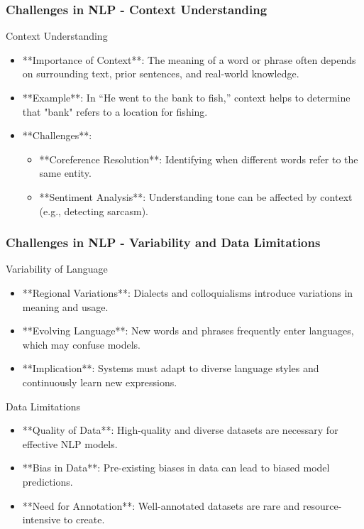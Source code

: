 \documentclass{beamer}
\begin{document}
\begin{frame}[fragile]
    \frametitle{Challenges in NLP - Context Understanding}
    \begin{block}{Context Understanding}
        \begin{itemize}
            \item **Importance of Context**: The meaning of a word or phrase often depends on surrounding text, prior sentences, and real-world knowledge.
            \item **Example**: In “He went to the bank to fish,” context helps to determine that "bank" refers to a location for fishing.
            \item **Challenges**:
            \begin{itemize}
                \item **Coreference Resolution**: Identifying when different words refer to the same entity.
                \item **Sentiment Analysis**: Understanding tone can be affected by context (e.g., detecting sarcasm).
            \end{itemize}
        \end{itemize}
    \end{block}
\end{frame}

\begin{frame}[fragile]
    \frametitle{Challenges in NLP - Variability and Data Limitations}
    \begin{block}{Variability of Language}
        \begin{itemize}
            \item **Regional Variations**: Dialects and colloquialisms introduce variations in meaning and usage.
            \item **Evolving Language**: New words and phrases frequently enter languages, which may confuse models.
            \item **Implication**: Systems must adapt to diverse language styles and continuously learn new expressions.
        \end{itemize}
    \end{block}
    
    \begin{block}{Data Limitations}
        \begin{itemize}
            \item **Quality of Data**: High-quality and diverse datasets are necessary for effective NLP models.
            \item **Bias in Data**: Pre-existing biases in data can lead to biased model predictions.
            \item **Need for Annotation**: Well-annotated datasets are rare and resource-intensive to create.
        \end{itemize}
    \end{block}
\end{frame}
\end{document}
